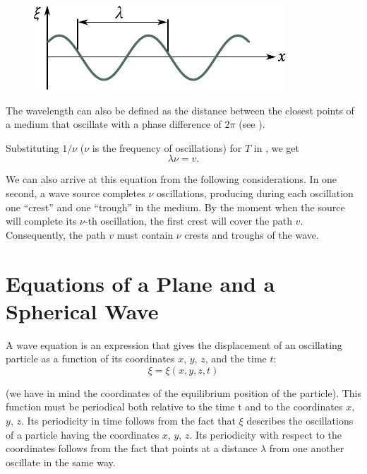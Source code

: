 \begin{figure}[t]
	\begin{center}
		\includegraphics[scale=1]{figures/ch_14/fig_14_3.pdf}
		\caption[]{}
		\label{fig:14_3}
	\end{center}
	\vspace{-0.85cm}
\end{figure}

The wavelength can also be defined as the distance between the closest points of a medium that oscillate with a phase difference of $2\pi$ (see ).

Substituting $1/\nu$ ($\nu$ is the frequency of oscillations) for $T$ in , we get
\begin{equation}\label{eq:14_2}
    \lambda\nu = v.
\end{equation}

\noindent
We can also arrive at this equation from the following considerations.
In one second, a wave source completes $\nu$ oscillations, producing during each oscillation one ``crest'' and one ``trough'' in the medium.
By the moment when the source will complete its $\nu$-th oscillation, the first crest will cover the path $v$.
Consequently, the path $v$ must contain $\nu$ crests and troughs of the wave.

\section{Equations of a Plane and a Spherical Wave}\label{sec:14_2}

A wave equation is an expression that gives the displacement of an oscillating particle as a function of its coordinates $x$, $y$, $z$, and the time $t$:
\begin{equation}\label{eq:14_3}
    \xi = \xi(x,y,z,t)
\end{equation}

\noindent
(we have in mind the coordinates of the equilibrium position of the particle).
This function must be periodical both relative to the time t and to the coordinates $x$, $y$, $z$.
Its periodicity in time follows from the fact that $\xi$ describes the oscillations of a particle having the coordinates $x$, $y$, $z$.
Its periodicity with respect to the coordinates follows from the fact that points at a distance $\lambda$ from one another oscillate in the same way.

